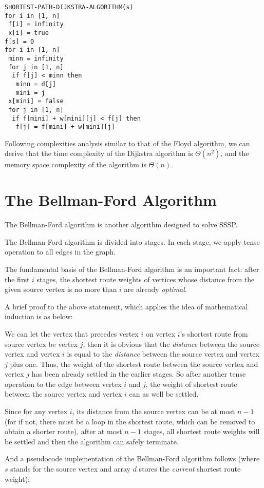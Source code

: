 \documentclass[a4paper,11pt,twocolumn]{article}
\begin{document}
\begin{verbatim}
SHORTEST-PATH-DIJKSTRA-ALGORITHM(s)
for i in [1, n]
 f[i] = infinity
 x[i] = true
f[s] = 0
for i in [1, n]
 minn = infinity
 for j in [1, n]
  if f[j] < minn then
   minn = d[j]
   mini = j
 x[mini] = false
 for j in [1, n]
  if f[mini] + w[mini][j] < f[j] then
   f[j] = f[mini] + w[mini][j]
\end{verbatim}

Following complexities analysis similar to that of the Floyd algorithm, we can derive that the time complexity of the Dijkstra algorithm is $\Theta(n^2)$, and the memory space complexity of the algorithm is $\Theta(n)$.

\section{The Bellman-Ford Algorithm}

The Bellman-Ford algorithm is another algorithm designed to solve SSSP.

The Bellman-Ford algorithm is divided into stages. In each stage, we apply tense operation to all edges in the graph.

The fundamental basis of the Bellman-Ford algorithm is an important fact: after the first $i$ stages, the shortest route weights of vertices whose distance from the given source vertex is no more than $i$ are already \emph{optimal}.

A brief proof to the above statement, which applies the idea of mathematical induction is as below:

We can let the vertex that precedes vertex $i$ on vertex $i$'s shortest route from source vertex be vertex $j$, then it is obvious that the \emph{distance} between the source vertex and vertex $i$ is equal to the \emph{distance} between the source vertex and vertex $j$ plus one. Thus, the weight of the shortest route between the source vertex and vertex $j$ has been already settled in the earlier stages. So after another tense operation to the edge between vertex $i$ and $j$, the weight of shortest route between the source vertex and vertex $i$ can as well be settled.

Since for any vertex $i$, its distance from the source vertex can be at most $n - 1$ (for if not, there must be a loop in the shortest route, which can be removed to obtain a shorter route), after at most $n - 1$ stages, all shortest route weights will be settled and then the algorithm can safely terminate.

And a pseudocode implementation of the Bellman-Ford algorithm follows (where $s$ stands for the source vertex and array $d$ stores the \emph{current} shortest route weight):
\end{document}
